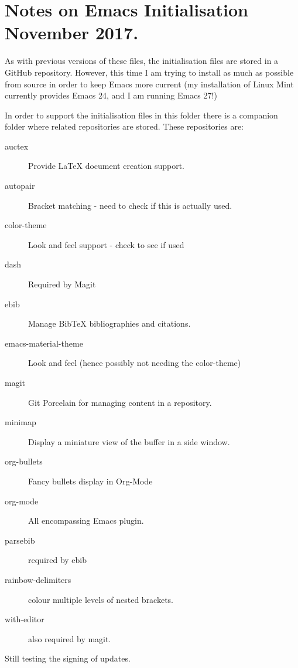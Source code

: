 \documentclass[a4paper]{article}
\begin{document}
\section{Notes on Emacs Initialisation November 2017.}
\label{sec:notes-emacs-init}

As with previous versions of these files, the initialisation files are
stored in a GitHub repository.  However, this time I am trying to
install as much as possible from source in order to keep Emacs more
current (my installation of Linux Mint currently provides Emacs 24,
and I am running Emacs 27!)

In order to support the initialisation files in this folder there is a
companion folder where related repositories are stored. These
repositories are:

\begin{description}
\item[auctex] Provide \LaTeX{} document creation support.
\item[autopair] Bracket matching - need to check if this is actually used.
\item[color-theme] Look and feel support - check to see if used
\item[dash] Required by Magit
\item[ebib] Manage BibTeX bibliographies and citations.
\item[emacs-material-theme] Look and feel (hence possibly not needing
  the color-theme)
\item[magit] Git Porcelain for managing content in a repository.
\item[minimap] Display a miniature view of the buffer in a side window.
\item[org-bullets] Fancy bullets display in Org-Mode
\item[org-mode] All encompassing Emacs plugin.
\item[parsebib] required by ebib
\item[rainbow-delimiters] colour multiple levels of nested brackets.
\item[with-editor] also required by magit.
\end{description}

Still testing the signing of updates.
\end{document}
